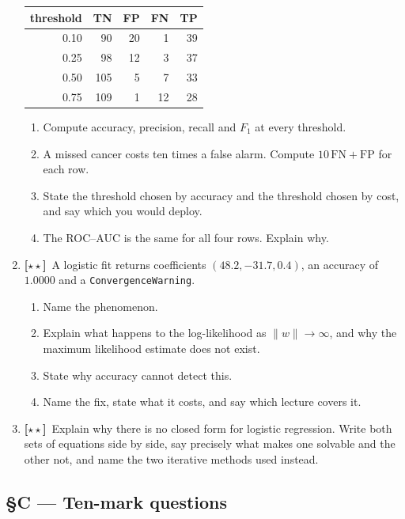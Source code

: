 \documentclass[11pt,a4paper]{article}
\newcommand{\LB}{{\footnotesize\textbf{[$\star\star$]}}}
\newcommand{\Q}[1]{\item[\textbf{#1}]}
\begin{document}
\begin{enumerate}[leftmargin=2.2cm]
\begin{center}
\begin{tabular}{@{}rrrrr@{}}
  threshold & TN & FP & FN & TP\\
  \midrule
  0.10 & 90 & 20 & 1 & 39\\
  0.25 & 98 & 12 & 3 & 37\\
  0.50 & 105 & 5 & 7 & 33\\
  0.75 & 109 & 1 & 12 & 28\\
  \bottomrule\end{tabular}\end{center}
  \begin{enumerate}[label=(\alph*)]
    \item Compute accuracy, precision, recall and $F_1$ at every threshold.
    \item A missed cancer costs ten times a false alarm. Compute
      $10\,\text{FN} + \text{FP}$ for each row.
    \item State the threshold chosen by accuracy and the threshold chosen by
      cost, and say which you would deploy.
    \item The ROC--AUC is the same for all four rows. Explain why.
  \end{enumerate}
\Q{U5.66}\LB\ A logistic fit returns coefficients $(48.2, -31.7, 0.4)$, an
  accuracy of $1.0000$ and a \texttt{ConvergenceWarning}.
  \begin{enumerate}[label=(\alph*)]
    \item Name the phenomenon.
    \item Explain what happens to the log-likelihood as $\|w\| \to \infty$,
      and why the maximum likelihood estimate does not exist.
    \item State why accuracy cannot detect this.
    \item Name the fix, state what it costs, and say which lecture covers it.
  \end{enumerate}
\Q{U5.67}\LB\ Explain why there is no closed form for logistic regression.
  Write both sets of equations side by side, say precisely what makes one
  solvable and the other not, and name the two iterative methods used instead.
\end{enumerate}

\subsection*{§C --- Ten-mark questions}
\end{document}
